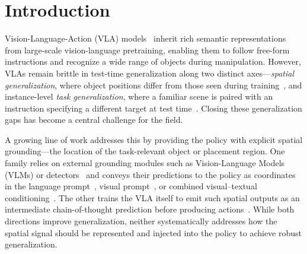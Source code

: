 \section{Introduction}
\label{sec:introduction}
Vision-Language-Action (VLA) models~\cite{rt22023arxiv, octo_2023, kim2024openvla, pi0, pi05, gr00tn1_2025} inherit rich semantic representations from large-scale vision-language pretraining, enabling them to follow free-form instructions and recognize a wide range of objects during manipulation. However, VLAs remain brittle in test-time generalization along two distinct axes—\emph{spatial generalization}, where object positions differ from those seen during training~\cite{zhou2025liberopro, fei25libero-plus}, and instance-level \emph{task generalization}, where a familiar scene is paired with an instruction specifying a different target at test time~\cite{zhou2025liberopro}. Closing these generalization gaps has become a central challenge for the field.

A growing line of work addresses this by providing the policy with explicit spatial grounding---the location of the task-relevant object or placement region. One family relies on external grounding modules such as Vision-Language Models (VLMs) or detectors~\cite{yuan2024robopoint, roboground} and conveys their predictions to the policy as coordinates in the language prompt~\cite{molmobot}, visual prompt~\cite{moka, wang2026vp}, or combined visual--textual conditioning~\cite{coavla}. The other trains the VLA itself to emit such spatial outputs as an intermediate chain-of-thought prediction before producing actions~\cite{molmoact2025, ecot, steerablepolicy}. While both directions improve generalization, neither systematically addresses how the spatial signal should be represented and injected into the policy to achieve robust generalization.

